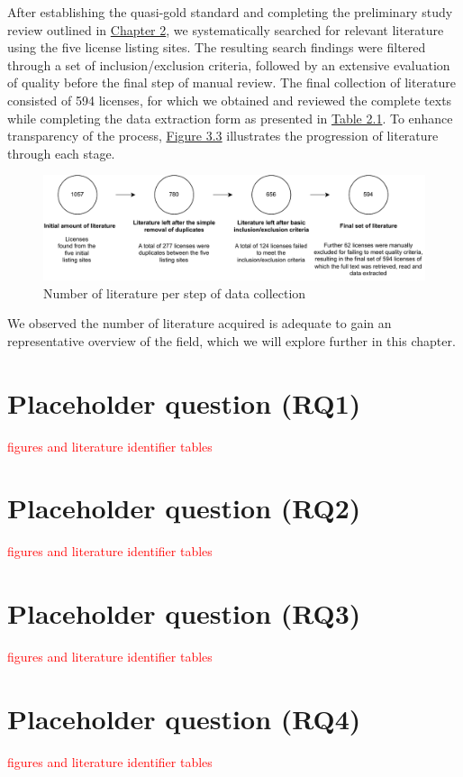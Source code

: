 After establishing the quasi-gold standard and completing the preliminary study review outlined in \hyperref[methods]{Chapter 2}, we systematically searched for relevant literature using the five license listing sites. The resulting search findings were filtered through a set of inclusion/exclusion criteria, followed by an extensive evaluation of quality before the final step of manual review. The final collection of literature consisted of 594 licenses, for which we obtained and reviewed the complete texts while completing the data extraction form as presented in \hyperref[table:extraction]{Table 2.1}. To enhance transparency of the process, \hyperref[fig:3-3]{Figure 3.3} illustrates the progression of literature through each stage.
\begin{figure}
	\centering
	\includegraphics[scale=0.8]{figures/figure-3-3.pdf}
	\caption{Number of literature per step of data collection}
	\label{fig:3-3}
\end{figure}
We observed the number of literature acquired is adequate to gain an representative overview of the field, which we will explore further in this chapter.


\section{Placeholder question (RQ1)}
\textcolor{red}{figures and literature identifier tables}
\section{Placeholder question (RQ2)}
\textcolor{red}{figures and literature identifier tables}
\section{Placeholder question (RQ3)}
\textcolor{red}{figures and literature identifier tables}
\section{Placeholder question (RQ4)}
\textcolor{red}{figures and literature identifier tables}

